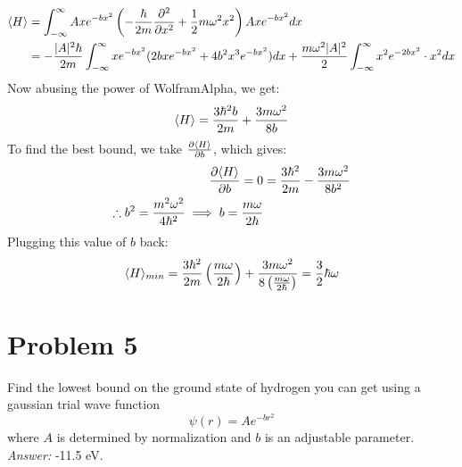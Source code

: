 \documentclass[10pt]{article}
\begin{document}
\begin{enumerate}[label=(\alph*)]
\begin{solution}
			\begin{align*}
				\langle H \rangle &= \int_{-\infty}^\infty Ax e^{-bx^2} \left( -\frac{\hbar}{2m} \pdv[2]{x} + \frac 12 m\omega^2 x^2\right) Axe^{-bx^2} dx\\
				&= -\frac{|A|^2 \hbar}{2m} \int_{-\infty}^\infty xe^{-bx^2} (2bxe^{-bx^2} + 4b^2x^3e^{-bx^2}) dx + \frac{m\omega^2 |A|^2}{2} \int_{-\infty}^\infty x^2 e^{-2bx^2} \cdot x^2 dx
			\end{align*}
			Now abusing the power of WolframAlpha, we get: 
			\[ \langle H \rangle = \frac{3\hbar^2 b}{2m} + \frac{3m\omega^2}{8b} \]
			To find the best bound, we take $\pdv{\langle H \rangle}{b}$, which gives: 
			\begin{align*}
				\pdv{\langle H \rangle}{b}= 0  &= \frac{3\hbar^2}{2m} - \frac{3m\omega^2}{8b^2}\\
				\therefore b^2 = \frac{m^2 \omega^2}{4\hbar^2} \implies b = \frac{m\omega}{2\hbar}
			\end{align*}
			Plugging this value of $b$ back: 
			\[ \langle H \rangle_{min} = \frac{3\hbar^2}{2m} \left( \frac{m\omega}{2\hbar}\right) + \frac{3m \omega^2}{8\left( \frac{m\omega}{2\hbar}\right)} = \frac32 \hbar \omega\]
		\end{solution}
	\end{enumerate}

	\pagebreak

	\section*{Problem 5}
	Find the lowest bound on the ground state of hydrogen you can get using a gaussian trial wave function 
	\[ \psi(r) = Ae^{-br^2}\] 
	where $A$ is determined by normalization and $b$ is an adjustable parameter. \textit{Answer:} -11.5 eV.
\end{document}
